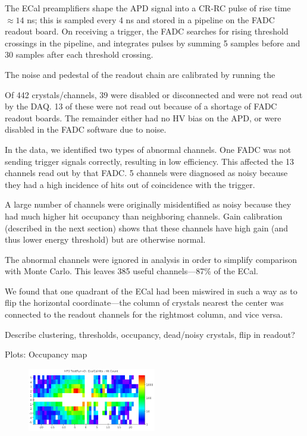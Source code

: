 
\vspace{1cm}{\bf ECal performance [Sho]}

The ECal preamplifiers shape the APD signal into a CR-RC pulse of rise time $\approx 14$ ns; this is sampled every 4 ns and stored in a pipeline on the FADC readout board.
On receiving a trigger, the FADC searches for rising threshold crossings in the pipeline, and integrates pulses by summing 5 samples before and 30 samples after each threshold crossing.

The noise and pedestal of the readout chain are calibrated by running the

Of 442 crystals/channels, 39 were disabled or disconnected and were not read out by the DAQ. 
13 of these were not read out because of a shortage of FADC readout boards.
The remainder either had no HV bias on the APD, or were disabled in the FADC software due to noise.

In the data, we identified two types of abnormal channels. 
One FADC was not sending trigger signals correctly, resulting in low efficiency. This affected the 13 channels read out by that FADC.
5 channels were diagnosed as noisy because they had a high incidence of hits out of coincidence with the trigger.

A large number of channels were originally misidentified as noisy because they had much higher hit occupancy than neighboring channels.
Gain calibration (described in the next section) shows that these channels have high gain (and thus lower energy threshold) but are otherwise normal.

The abnormal channels were ignored in analysis in order to simplify comparison with Monte Carlo. This leaves 385 useful channels---87\% of the ECal.

We found that one quadrant of the ECal had been miswired in such a way as to flip the horizontal coordinate---the column of crystals nearest the center was connected to the readout channels for the rightmost column, and vice versa.


Describe clustering, thresholds, occupancy, dead/noisy crystals, flip in readout?

Plots: Occupancy map

\begin{figure}[ht]
	\includegraphics[width=0.5\textwidth]{test2012/ecalperformance/hitrates}
	\caption{\small{}}
	\label{fig:hitrates}
\end{figure}

